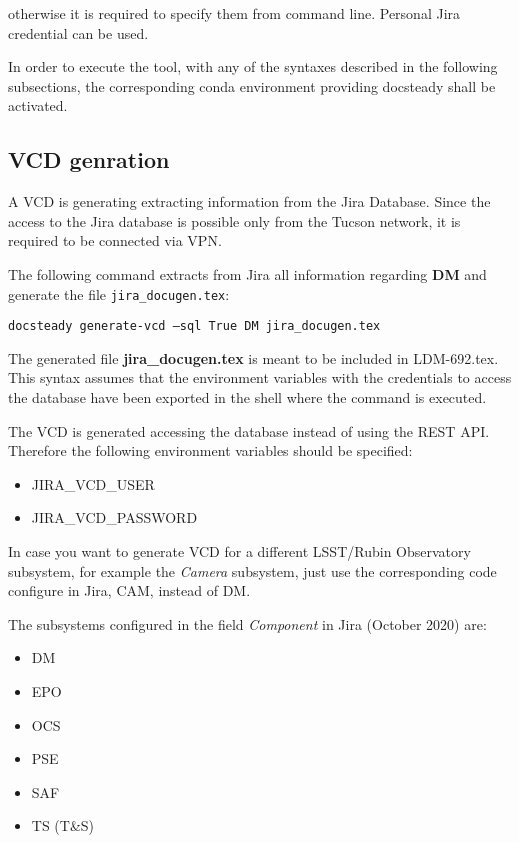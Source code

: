 \documentclass[DM]{lsstdoc}
\begin{document}
otherwise it is required to specify them from command line.
Personal Jira credential can be used.

In order to execute the tool, with any of the syntaxes described in the following subsections, the corresponding conda environment providing docsteady shall be activated.



\subsection{VCD genration}

A VCD is generating extracting information from the Jira Database.
Since the access to the Jira database is possible only from the Tucson network, it is required to be connected via VPN.

The following command extracts from Jira all information regarding \textbf{DM} and generate the file \texttt{jira\_docugen.tex}:

\texttt{docsteady generate-vcd --sql True DM jira\_docugen.tex}

The generated file \textbf{jira\_docugen.tex} is meant to be included in LDM-692.tex.
This syntax assumes that the environment variables with the credentials to access the database have been exported in the shell where the command is executed.

The VCD is generated accessing the database instead of using the REST API. Therefore the following environment variables should be specified:

\begin{itemize}
\item JIRA\_VCD\_USER
\item JIRA\_VCD\_PASSWORD
\end{itemize}

In case you want to generate VCD for a different LSST/Rubin Observatory subsystem, for example the \textit{Camera} subsystem,
just use the corresponding code configure in Jira, CAM, instead of DM.

The subsystems configured in the field \textit{Component} in Jira (October 2020) are:
\begin{itemize}
\item DM
\item EPO
\item OCS
\item PSE
\item SAF
\item TS (T\&S)
\end{itemize}
\end{document}
